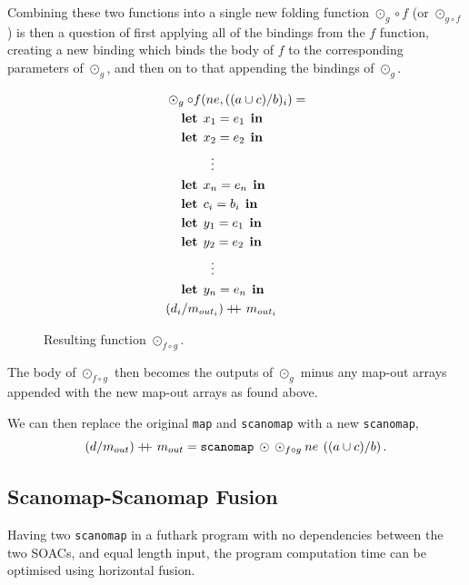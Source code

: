 \documentclass[11pt]{article}
\newcommand\doubleplus{+\kern-1.3ex+\kern0.8ex}
\newcommand\lett{\phantom{-}\:\:\mathbf{let}\:\:}
\newcommand\inn{\:\:\mathbf{in}\:\:}
\begin{document}
Combining these two functions into a single new folding function $\odot_g \circ f$ (or $\odot_{g \circ f}$) is then a question of first applying all of the bindings
 from the $f$ function, creating a new binding which binds the body of $f$ to the corresponding parameters of $\odot_g$, and then on
 to that appending the bindings of $\odot_g$.


\begin{figure}[h!]\centering
  \begin{mdframed}[style=alignbox]
    \begin{align*}
      &\odot_{g} \circ f(ne, ((a \cup c) / b)_i) = \\
      &\lett x_1 = e_1 \inn\\
      &\lett x_2 = e_2 \inn\\
      &\phantom{----}\vdots\\
      &\lett x_n = e_n \inn\\
      &\lett c_i = b_i \inn\\
      &\lett y_1 = e_1 \inn\\
      &\lett y_2 = e_2 \inn\\
      &\phantom{----}\vdots\\
      &\lett y_n = e_n \inn\\
      &(d_i /m_{out_i}) \doubleplus m_{out_i}
    \end{align*}
  \end{mdframed}

  \caption{Resulting function $\odot_{f \circ g}$.}
  \label{fig:fusresfun}
\end{figure}
The body of $\odot_{f\circ g}$ then becomes the outputs of $\odot_g$ minus any map-out arrays appended with the new map-out arrays as
 found above.

We can then replace the original \texttt{map} and \texttt{scanomap} with a new \texttt{scanomap},
$$(d / m_{out}) \doubleplus m_{out} = \mathtt{scanomap} \: \odot \: \odot_{f \circ g} \: ne \: \left((a \cup c) / b \right)\mathnormal{.} $$

\clearpage
\subsection{Scanomap-Scanomap Fusion}
Having two \texttt{scanomap} in a futhark program with no dependencies between the two SOACs, and equal length input, the program computation time can be optimised using horizontal fusion. 
\end{document}
